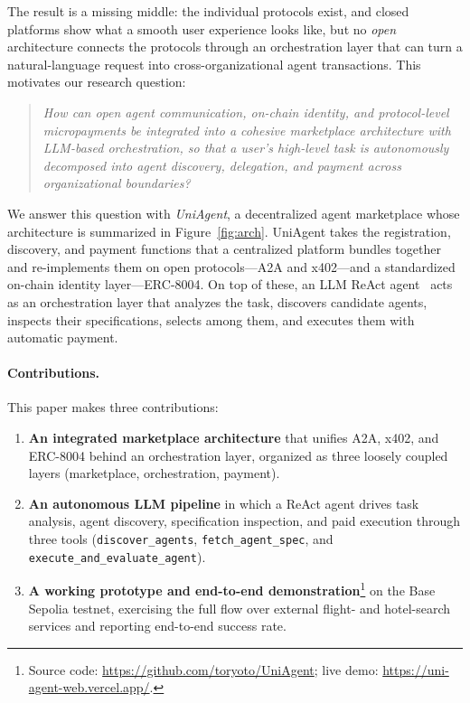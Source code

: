 \documentclass[sigconf]{acmart}
\begin{document}
The result is a missing middle: the individual protocols exist, and
closed platforms show what a smooth user experience looks like, but no
\emph{open} architecture connects the protocols through an
orchestration layer that can turn a natural-language request into
cross-organizational agent transactions. This motivates our research
question:

\begin{quote}
\itshape How can open agent communication, on-chain identity, and
protocol-level micropayments be integrated into a cohesive marketplace
architecture with LLM-based orchestration, so that a user's high-level
task is autonomously decomposed into agent discovery, delegation, and
payment across organizational boundaries?
\end{quote}

We answer this question with \emph{UniAgent}, a decentralized agent
marketplace whose architecture is summarized in
Figure~\ref{fig:arch}. UniAgent takes the registration, discovery, and
payment functions that a centralized platform bundles together and
re-implements them on open protocols---A2A and x402---and a
standardized on-chain identity layer---ERC-8004. On top of these, an
LLM ReAct agent~\cite{yao2023react} acts as an orchestration layer that
analyzes the task, discovers candidate agents, inspects their
specifications, selects among them, and executes them with automatic
payment.

\paragraph{Contributions.} This paper makes three contributions:
\begin{enumerate}
  \item \textbf{An integrated marketplace architecture} that unifies
    A2A, x402, and ERC-8004 behind an orchestration layer, organized
    as three loosely coupled layers (marketplace, orchestration,
    payment).
  \item \textbf{An autonomous LLM pipeline} in which a ReAct agent
    drives task analysis, agent discovery, specification inspection,
    and paid execution through three tools (\texttt{discover\_agents},
    \texttt{fetch\_agent\_spec}, and
    \texttt{execute\_and\_evaluate\_agent}).
  \item \textbf{A working prototype and end-to-end
    demonstration}\footnote{Source code:
    \url{https://github.com/toryoto/UniAgent}; live demo:
    \url{https://uni-agent-web.vercel.app/}.} on
    the Base Sepolia testnet, exercising the full flow over external
    flight- and hotel-search services and reporting end-to-end success
    rate.
\end{enumerate}
\end{document}
